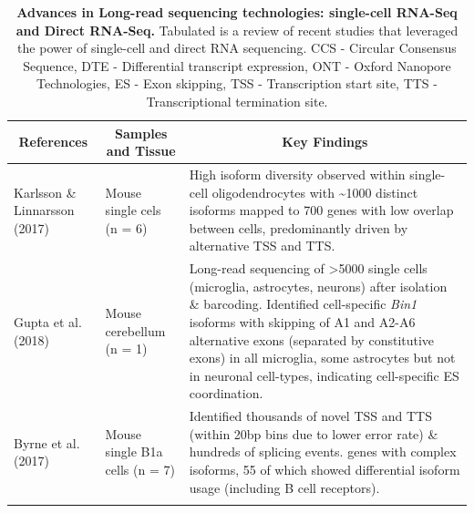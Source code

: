 \begin{landscape}
	\small %
	\setlength\tabcolsep{2pt} %
	\renewcommand{\arraystretch}{1}
	\begin{longtable}[c]{p{4cm}p{4cm}p{18cm}}
		\caption[Long-read sequencing studies on single cells and using RNA]%
		{\textbf{Advances in Long-read sequencing technologies: single-cell RNA-Seq and Direct RNA-Seq.} Tabulated is a review of recent studies that leveraged the power of single-cell and direct RNA sequencing. CCS - Circular Consensus Sequence, DTE - Differential transcript expression, ONT - Oxford Nanopore Technologies, ES - Exon skipping, TSS - Transcription start site, TTS - Transcriptional termination site.}
		\label{tab: longread_advancedstudies}\\
		
		\toprule
		\multicolumn{1}{c}{References} &
		\multicolumn{1}{c}{Samples and Tissue} &
		\multicolumn{1}{c}{Key Findings} \\* \midrule
		\endfirsthead
		\endhead
		\bottomrule
		\endfoot
		\endlastfoot
		\centering Karlsson \& Linnarsson (2017)\cite{Karlsson2017} &
		\centering Mouse single cels (n = 6)  &
		\tabitem High isoform diversity observed within single-cell oligodendrocytes with \textasciitilde1000 distinct isoforms mapped to 700 genes with low overlap between cells, predominantly driven by alternative TSS and TTS. \\
		\hdashline[0.5pt/5pt]	
		
		\centering Gupta et al. (2018) \cite{Gupta2018} &
		\centering Mouse cerebellum (n = 1)  &
		\tabitem Long-read sequencing of >5000 single cells (microglia, astrocytes, neurons) after isolation \& barcoding. \newline 
		\tabitem Identified cell-specific \textit{Bin1} isoforms with skipping of A1 and A2-A6 alternative exons (separated by constitutive exons) in all microglia, some astrocytes but not in neuronal cell-types, indicating cell-specific ES coordination. \\
		\hdashline[0.5pt/5pt]			
		
		\centering Byrne et al. (2017)\cite{Byrne2017} &
		\centering Mouse single B1a cells \newline(n = 7) &
		\tabitem Identified thousands of novel TSS and TTS (within 20bp bins due to lower error rate) \& hundreds of splicing events.\newline
		\tabitem 160 genes with complex isoforms, 55 of which showed differential isoform usage (including B cell receptors). \\
		\hdashline[0.5pt/5pt]
		

\end{longtable}
\end{landscape}
